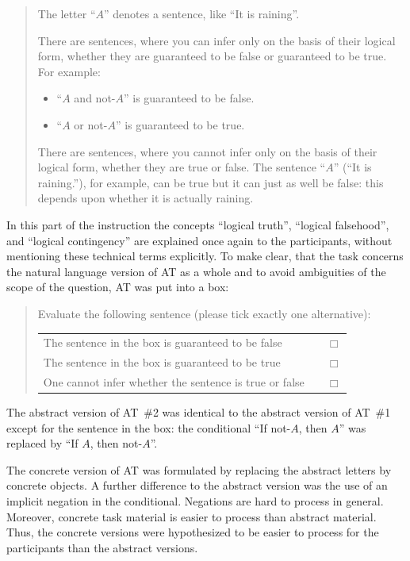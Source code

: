 \documentclass[11pt]{article}
\begin{document}
\begin{quote}
\footnotesize
\noindent
The letter ``$A$'' denotes a sentence, like ``It is raining''.


There are sentences, where you can infer only on the basis of their
logical form, whether they are guaranteed to be false or guaranteed to
be true. For example:

\begin{itemize}

\item ``$A$ and not-$A$'' is guaranteed to be false.
\item ``$A$ or not-$A$'' is guaranteed to be true.
\end{itemize}
There are sentences, where you cannot infer only on the basis of
their logical form, whether they are true or false. The sentence
``$A$'' (``It is raining.''), for example, can be true but it can just
as well be false: this depends upon whether it is actually raining.
\end{quote}
\normalsize In this part of the instruction the concepts
``logical truth'', ``logical falsehood'', and ``logical contingency''
are explained once again to the participants, without mentioning these
technical terms explicitly. To make clear, that the task concerns the
natural language version of AT as a whole and to avoid ambiguities of
the scope of the question, AT was put into a box:

\begin{quote}
\footnotesize
\noindent
Evaluate the following sentence (please tick exactly one alternative):

\begin{center}
\end{center}
\begin{tabular}{lll}
The sentence in the box is guaranteed to be false && $\Box$ \\
The sentence in the box is guaranteed to be true && $\Box$ \\
One cannot infer whether the sentence is true or false && $\Box$ \\
\end{tabular}
\end{quote}
\normalsize

The abstract version of AT~\#2 was identical to the abstract version
of AT~\#1 except for the sentence in the box: the conditional ``If
not-$A$, then $A$'' was replaced by ``If $A$, then not-$A$''.

The concrete version of AT was formulated by replacing the abstract
letters by concrete objects. A further difference to the abstract
version was the use of an implicit negation in the
conditional. Negations are hard to process in general. Moreover,
concrete task material is easier to process than abstract
material. Thus, the concrete versions were hypothesized to be easier
to process for the participants than the abstract versions.
\end{document}
